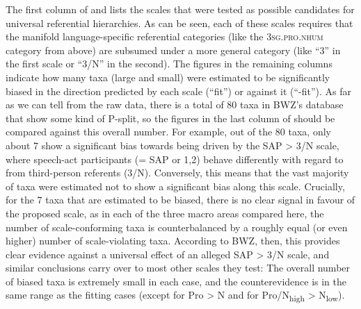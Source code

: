 \documentclass[output=paper]{langscibook}
\begin{document}
The first column of  and  lists the scales that were tested as possible candidates for universal referential hierarchies. As can be seen, each of these scales requires that the manifold language-specific referential categories (like the 3\textsc{sg.pro.nhum} category from above) are subsumed under a more general category (like “3” in the first scale or “3/N” in the second). The figures in the remaining columns indicate how many taxa (large and small) were estimated to be significantly biased in the direction predicted by each scale (“fit”) or against it (“-fit”). As far as we can tell from the raw data, there is a total of 80 taxa in BWZ’s database that show some kind of P-split, so the figures in the last column of  should be compared against this overall number. For example, out of the 80 taxa, only about 7 show a significant bias towards being driven by the SAP > 3/N scale, \ie where speech-act participants (= SAP or 1,2) behave differently with regard to  from third-person referents (3/N). Conversely, this means that the vast majority of taxa were estimated not to show a significant bias along this scale. Crucially, for the 7 taxa that are estimated to be biased, there is no clear signal in favour of the proposed scale, as in each of the three macro areas compared here, the number of scale-conforming taxa is counterbalanced by a roughly equal (or even higher) number of scale-violating taxa. According to BWZ, then, this provides clear evidence against a universal effect of an alleged SAP > 3/N scale, and similar conclusions carry over to most other scales they test: The overall number of biased taxa is extremely small in each case, and the counterevidence is in the same range as the fitting cases (except for Pro > N and for Pro/N\textsubscript{high} > N\textsubscript{low}).

 
\end{document}
